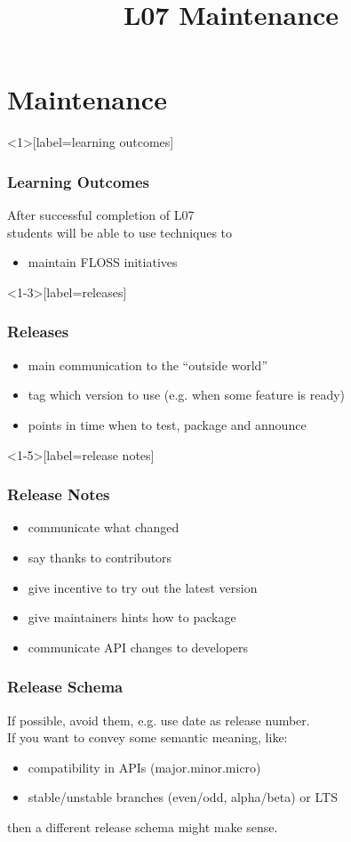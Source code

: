 

\title{L07 Maintenance}



\section{Maintenance}

\begin{frame}<1>[label=learning outcomes]
	\frametitle{Learning Outcomes}
	After successful completion of L07 \\
	students will be able to
	use techniques to

	\begin{itemize}
	\item maintain FLOSS initiatives
	\end{itemize}
\end{frame}

\begin{frame}<1-3>[label=releases]
	\frametitle{Releases}

	\begin{itemize}[<+-| alert@+>]
	\item main communication to the ``outside world''
	\item tag which version to use (e.g. when some feature is ready)
	\item points in time when to test, package and announce
	\end{itemize}
\end{frame}

\begin{frame}<1-5>[label=release notes]
	\frametitle{Release Notes}

	\begin{itemize}[<+-| alert@+>]
	\item communicate what changed
	\item say thanks to contributors
	\item give incentive to try out the latest version
	\item give maintainers hints how to package
	\item communicate API changes to developers
	\end{itemize}
\end{frame}

\begin{frame}
	\frametitle{Release Schema}

	If possible, avoid them, e.g. use date as release number. \\
	If you want to convey some semantic meaning, like:

	\begin{itemize}[<+-| alert@+>]
	\item compatibility in APIs (major.minor.micro)
	\item stable/unstable branches (even/odd, alpha/beta) or LTS
	\end{itemize}

	\pause[\thebeamerpauses]  %

	then a different release schema might make sense.
\end{frame}

